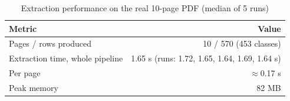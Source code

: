 \begin{table}[H]
\centering
\caption{Extraction performance on the real 10-page PDF (median of 5 runs)}
\label{tab:extractperf}
\small
\begin{tabular}{@{}lr@{}}
\toprule
\textbf{Metric} & \textbf{Value}\\
\midrule
Pages / rows produced & 10 / 570 (453 classes)\\
Extraction time, whole pipeline & 1.65 s (runs: 1.72, 1.65, 1.64, 1.69, 1.64 s)\\
Per page & $\approx$0.17 s\\
Peak memory & 82 MB\\
\bottomrule
\end{tabular}
\end{table}
